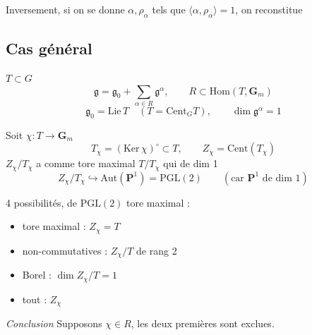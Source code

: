 \documentclass[11pt,a4paper]{article}
\begin{document}
Inversement, si on se donne $\alpha, \rho_\alpha$ tels que $\langle \alpha,
\rho_\alpha \rangle = 1$, on reconstitue \ill{}

\subsection*{Cas général}

$T \subset G$ 
\[
  \mathfrak{g} = \mathfrak{g}_0 + \sum_{\alpha \in R} \mathfrak{g}^{\alpha},
  \qquad R \subset \mathrm{Hom}(T, \mathbf{G}_m)
\]
\[
  \mathfrak{g}_0 = \mathrm{Lie}\,T \quad (T = \mathrm{Cent}_G T), \qquad
  \dim \mathfrak{g}^{\alpha} = 1
\]


Soit $\chi : T \to \mathbf{G}_m$
\[
  T_\chi = (\mathrm{Ker}\,\chi)^{\circ} \subset T, \qquad
  Z_\chi = \mathrm{Cent}(T_\chi)
\]
$Z_\chi / T_\chi$ a comme tore maximal $T/T_\chi$ qui \ill{} de dim 1
\[
  Z_\chi / T_\chi \hookrightarrow \mathrm{Aut}(\mathbf{P}^1) = \mathrm{PGL}(2)
  \qquad (\text{car } \mathbf{P}^1 \text{ de dim } 1)
\]

4 possibilités,  de $\mathrm{PGL}(2)$ \ill{} tore
maximal :
\begin{itemize}
  \item tore maximal \quad : \quad $Z_\chi = T$
  \item \ill{} non-commutatives \quad : \quad $Z_\chi/T$ de rang 2
  \item Borel \quad : \quad $\dim Z_\chi/T = 1$
  \item tout \quad : \quad $Z_\chi$  \ill{}
\end{itemize}

\emph{Conclusion} Supposons $\chi \in R$, les deux premières sont exclues.
\end{document}
